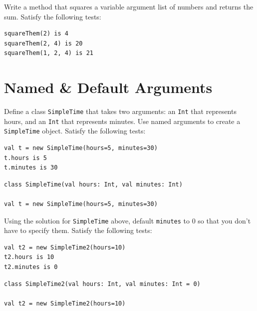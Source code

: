 \documentclass[a4paper,12pt]{exam}
\begin{document}
\begin{questions}
\begin{solution}
\end{solution}

\question
Write a method that squares a variable argument list of numbers and returns the sum. 
Satisfy the following tests:
\begin{Verbatim}
squareThem(2) is 4
squareThem(2, 4) is 20
squareThem(1, 2, 4) is 21
\end{Verbatim}

\begin{solution}
\end{solution}

\section*{Named \& Default Arguments}

\question
Define a class \texttt{SimpleTime} that takes two arguments: an \texttt{Int} 
that represents hours, and an \texttt{Int} that represents minutes. 
Use named arguments to create a \texttt{SimpleTime} object. Satisfy the following tests:
\begin{Verbatim}
val t = new SimpleTime(hours=5, minutes=30) 
t.hours is 5
t.minutes is 30
\end{Verbatim}

\begin{solution}
\begin{Verbatim}
class SimpleTime(val hours: Int, val minutes: Int)

val t = new SimpleTime(hours=5, minutes=30)	
\end{Verbatim}	
\end{solution}

\question
Using the solution for \texttt{SimpleTime} above, default \texttt{minutes} to 0 
so that you don’t have to specify them. Satisfy the following tests: 
\begin{Verbatim}
val t2 = new SimpleTime2(hours=10)
t2.hours is 10
t2.minutes is 0
\end{Verbatim}

\begin{solution}
\begin{Verbatim}
class SimpleTime2(val hours: Int, val minutes: Int = 0)

val t2 = new SimpleTime2(hours=10)	
\end{Verbatim}	
\end{solution}


\end{questions}
\end{document}

